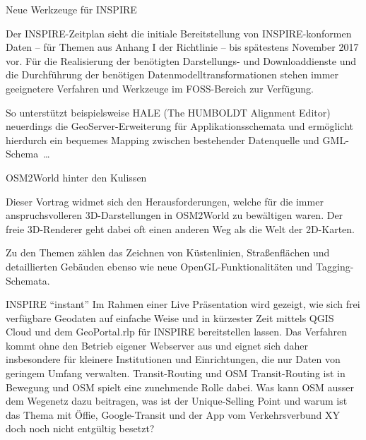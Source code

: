 \newpage
\enlargethispage{1\baselineskip}
\vspace{0.2\baselineskip}\newline

%

%
{Neue Werkzeuge für INSPIRE}%
{}%
{Der INSPIRE-Zeitplan sieht die initiale Bereitstellung von INSPIRE-konformen
Daten -- für Themen aus Anhang I der Richtlinie -- bis spätestens November 2017 vor.
Für die Realisierung der benötigten Darstellungs- und Download\-dienste und die Durchführung
der benötigen Datenmodelltransformationen stehen immer geeignetere Verfahren und Werkzeuge
im FOSS-Bereich zur Verfügung.

So unterstützt beispielsweise HALE (The HUMBOLDT Alignment Editor) neuerdings die GeoServer-Erweiterung
für Applikationsschemata und ermöglicht hierdurch ein bequemes Mapping zwischen
bestehender Datenquelle und GML-Schema~\dots}

\enlargethispage{2\baselineskip}
%
{OSM2World hinter den Kulissen}%
{}%
{Dieser Vortrag widmet sich den Herausforderungen, welche für die immer anspruchsvolleren 3D-Darstellungen in
OSM2World zu bewältigen waren. Der freie 3D-Renderer geht dabei oft einen anderen Weg als die Welt der 2D-Karten.

Zu den Themen zählen das Zeichnen von Küstenlinien, Straßenflächen und detaillierten Gebäuden ebenso wie neue
OpenGL-Funktionalitäten und Tagging-Schemata.}
%
%
{INSPIRE "`instant"'}%
{}%
{Im Rahmen einer Live Präsentation wird gezeigt, wie sich frei verfügbare Geodaten auf einfache Weise und
in kürzester Zeit mittels QGIS Cloud und dem GeoPortal.rlp für INSPIRE bereitstellen lassen.
Das Verfahren kommt ohne den Betrieb eigener Webserver aus und eignet sich daher insbesondere
für kleinere Institutionen und Einrichtungen, die nur Daten von geringem Umfang verwalten.}
%
%
{Transit-Routing und OSM}%
{}%
{Transit-Routing ist in Bewegung und OSM spielt eine zunehmende Rolle dabei.
Was kann OSM ausser dem Wegenetz dazu beitragen, was ist der Unique-Selling Point
und warum ist das Thema mit Öffie, Google-Transit und der App vom Verkehrsverbund XY doch noch nicht entgültig besetzt?}

